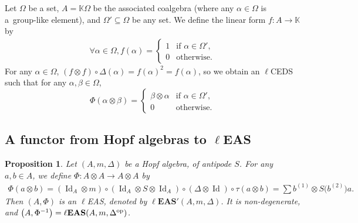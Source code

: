 \documentclass[pdftex]{sigma}
\numberwithin{equation}{section}
\newtheorem{Proposition}[Theorem]{Proposition}
 { \theoremstyle{definition}
\newtheorem{Definition}[Theorem]{Definition}
\newtheorem{Note}[Theorem]{Note}
\newtheorem{Example}[Theorem]{Example}
\newtheorem{Remark}[Theorem]{Remark}
\newtheorem{Notation}[Theorem]{Notation}}
\newcommand{\leas}{\ell\mathbf{EAS}}
\begin{document}
\begin{Example}
Let $\Omega$ be a set, $A=\mathbb{K}\Omega$ be the associated coalgebra (where any $\alpha \in \Omega$ is a~group-like element), and $\Omega'\subseteq \Omega$ be any set. We define the linear form $f\colon A\longrightarrow \mathbb{K}$ by
\begin{align*}
 \forall \alpha \in \Omega, f(\alpha) =\begin{cases}
1& \text{if }\alpha \in \Omega',\\
0 & \text{otherwise}.
\end{cases} \end{align*}
For any $\alpha \in \Omega$, $(f\otimes f)\circ \Delta(\alpha)=f(\alpha)^2=f(\alpha)$, so we obtain an $\ell$CEDS such that for any $\alpha,\beta \in \Omega$,
\[\Phi(\alpha \otimes \beta)=\begin{cases}
\beta\otimes \alpha&\text{if }\alpha \in \Omega',\\
0 & \text{otherwise}.
\end{cases}\] \end{Example}


\subsection[A functor from Hopf algebras to lEAS]{A functor from Hopf algebras to $\boldsymbol{\ell}$EAS}

\begin{Proposition}\label{prop5.7}
Let $(A,m,\Delta)$ be a Hopf algebra, of antipode $S$. For any $a,b\in A$, we define $\Phi\colon A\otimes A\longrightarrow A\otimes A$ by
\begin{gather*}
\Phi(a\otimes b)=(\operatorname{Id}_A\otimes m)\circ (\operatorname{Id}_A\otimes S\otimes \operatorname{Id}_A)\circ (\Delta \otimes \operatorname{Id})\circ \tau(a\otimes b)=\sum b^{(1)}\otimes S\bigl(b^{(2)}\bigr)a.
\end{gather*}
Then $(A,\Phi)$ is an $\ell$EAS, denoted by $\leas'(A,m,\Delta)$. It is non-degenerate, and $\bigl(A,\Phi^{-1}\bigr)=\leas(A,m,\Delta^{\rm op})$.
\end{Proposition}
\end{document}
